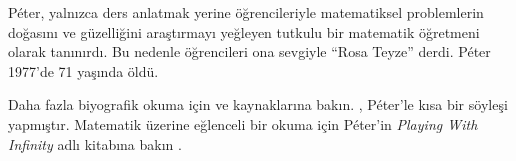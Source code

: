 \documentclass[../../../include/open-logic-section]{subfiles}
\begin{document}
P\'{e}ter, yalnızca ders anlatmak yerine öğrencileriyle matematiksel
problemlerin doğasını ve güzelliğini araştırmayı yeğleyen tutkulu bir
matematik öğretmeni olarak tanınırdı. Bu nedenle öğrencileri ona sevgiyle
``Rosa Teyze'' derdi. P\'eter 1977'de 71 yaşında öldü.

\begin{reading}
Daha fazla biyografik okuma için \citep{Oconnor2014} ve
\citep{Andrasfai1986} kaynaklarına bakın. \citet{Tamassy1994}, P\'eter'le kısa
bir söyleşi yapmıştır. Matematik üzerine eğlenceli bir okuma için P\'eter'in
\emph{Playing With Infinity} adlı kitabına bakın \citep{Peter2010}.
\end{reading}
\end{document}
